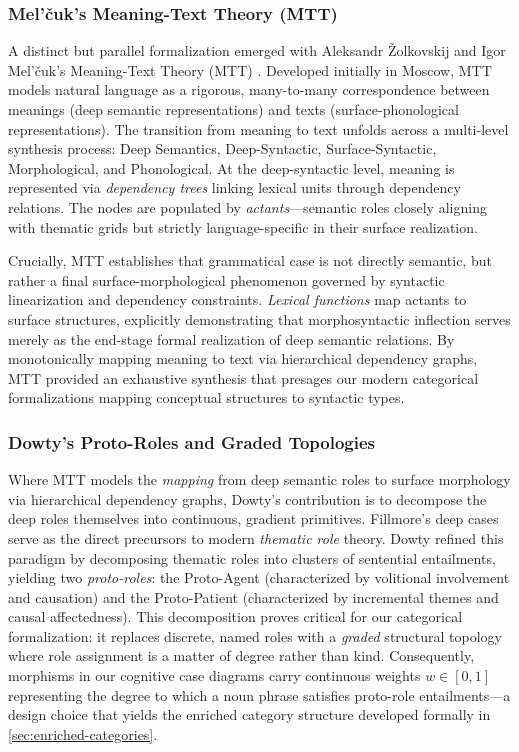 \documentclass[
]{article}
\begin{document}
\subsubsection{Mel'čuk's Meaning-Text Theory
(MTT)}\label{melux10duks-meaning-text-theory-mtt}

A distinct but parallel formalization emerged with Aleksandr Žolkovskij
and Igor Mel'čuk's Meaning-Text Theory (MTT)
\citep{zolkovskij1965possible, melcuk1981meaning, melcuk1988dependency}.
Developed initially in Moscow, MTT models natural language as a
rigorous, many-to-many correspondence between meanings (deep semantic
representations) and texts (surface-phonological representations). The
transition from meaning to text unfolds across a multi-level synthesis
process: Deep Semantics, Deep-Syntactic, Surface-Syntactic,
Morphological, and Phonological. At the deep-syntactic level, meaning is
represented via \emph{dependency trees} linking lexical units through
dependency relations. The nodes are populated by
\emph{actants}---semantic roles closely aligning with thematic grids but
strictly language-specific in their surface realization.

Crucially, MTT establishes that grammatical case is not directly
semantic, but rather a final surface-morphological phenomenon governed
by syntactic linearization and dependency constraints. \emph{Lexical
functions} map actants to surface structures, explicitly demonstrating
that morphosyntactic inflection serves merely as the end-stage formal
realization of deep semantic relations. By monotonically mapping meaning
to text via hierarchical dependency graphs, MTT provided an exhaustive
synthesis that presages our modern categorical formalizations mapping
conceptual structures to syntactic types.

\subsubsection{Dowty's Proto-Roles and Graded
Topologies}\label{dowtys-proto-roles-and-graded-topologies}

Where MTT models the \emph{mapping} from deep semantic roles to surface
morphology via hierarchical dependency graphs, Dowty's contribution is
to decompose the deep roles themselves into continuous, gradient
primitives. Fillmore's deep cases serve as the direct precursors to
modern \emph{thematic role} theory. Dowty
\citeyearpar{dowty1991thematic} refined this paradigm by decomposing
thematic roles into clusters of sentential entailments, yielding two
\emph{proto-roles}: the Proto-Agent (characterized by volitional
involvement and causation) and the Proto-Patient (characterized by
incremental themes and causal affectedness). This decomposition proves
critical for our categorical formalization: it replaces discrete, named
roles with a \emph{graded} structural topology where role assignment is
a matter of degree rather than kind. Consequently, morphisms in our
cognitive case diagrams carry continuous weights \(w \in [0,1]\)
representing the degree to which a noun phrase satisfies proto-role
entailments---a design choice that yields the enriched category
structure developed formally in \autoref{sec:enriched-categories}.
\end{document}
